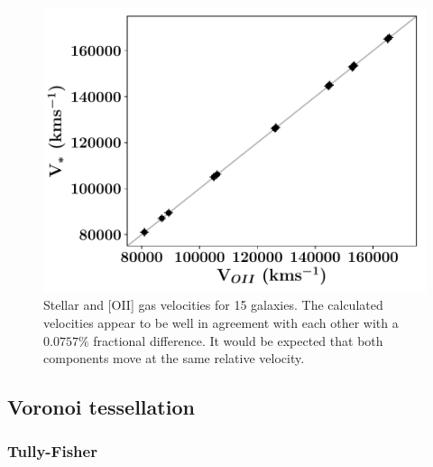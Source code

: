 \documentclass[12pt, twocolumn]{revtex4-1}    %
\begin{document}

\begin{figure}
\includegraphics[width=1.0\linewidth]{data/vel_star_vs_vel_oii}
\caption{Stellar and [OII] gas velocities for 15 galaxies. The calculated velocities appear to be well in agreement with each other with a $0.0757\%$ fractional difference. It would be expected that both components move at the same relative velocity.}
\label{fig:velocities}
\end{figure}


\subsection{Voronoi tessellation}

\subsubsection{Tully-Fisher}

\onecolumngrid
\end{document}
